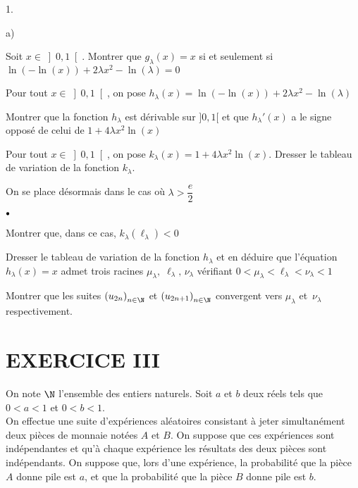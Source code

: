 \documentclass[11pt]{article}%
\begin{document}
\begin{noliste}{1.}
\begin{noliste}{a)}
\item Soit $x\in \left] 0,1\right[ $. Montrer que $g_{\lambda }\left(
x\right) = x$ si et seulement si $\ln \left( -\ln \left( x\right)
\right)
 + 2\lambda x^{2}-\ln \left( \lambda \right) = 0$

\item Pour tout $x\in \left] 0,1\right[ $, on pose $h_{\lambda }\left(
x\right) = \ln \left( -\ln \left( x\right) \right) + 2\lambda x^{2}-\ln
\left(
\lambda \right) $

Montrer que la fonction $h_{\lambda }$ est dérivable sur $]0,1[$ et que
$h_{\lambda }{\prime }\left( x\right) $ a le signe opposé de celui de
$1 + 4\lambda x^{2}\ln \left( x\right) $

\item Pour tout $x\in \left] 0,1\right[ $, on pose $k_{\lambda }\left(
x\right) = 1 + 4\lambda x^{2}\ln \left( x\right) $. Dresser le tableau
de
variation de la fonction $k_{\lambda }$.

\item On se place désormais dans le cas où $\lambda >\dfrac{e}{2}$

\begin{noliste}{$\scriptstyle \bullet$}
\item Montrer que, dans ce cas, $k_{\lambda }\left( \ell_{\lambda
}\right)
<0$

\item Dresser le tableau de variation de la fonction $h_{\lambda }$ et
en déduire que l'équation $h_{\lambda }\left( x\right) = x$ admet trois
racines $\mu_{\lambda },\;\ell_{\lambda },\,\nu_{\lambda }$ vérifiant
$0<\mu
_{\lambda }<\ell_{\lambda }<\nu_{\lambda }<1$

\item Montrer que les suites $\left( u_{2n}\right)_{n\in \N}$ et
$\left( u_{2n + 1}\right)_{n\in \N}$ convergent vers $\mu_{\lambda }$
et $\,\nu_{\lambda }$ respectivement.
\end{noliste}
\end{noliste}
\end{noliste}

\section*{EXERCICE III}

On note $\N$ l'ensemble des entiers naturels. Soit $a$ et $b$ deux
réels tels que $0<a<1$ et $0<b<1$.\\
On effectue une suite d'expériences aléatoires consistant à jeter
simultanément deux pièces de monnaie notées $A$ et $B$. On suppose que
ces expériences sont indépendantes et qu'à chaque expérience les
résultats des deux
pièces sont indépendants. On suppose que, lors d'une expérience, la
probabilité que la pièce $A$ donne pile est $a$, et que la probabilité
que
la pièce $B$ donne pile est $b$.
\end{document}
